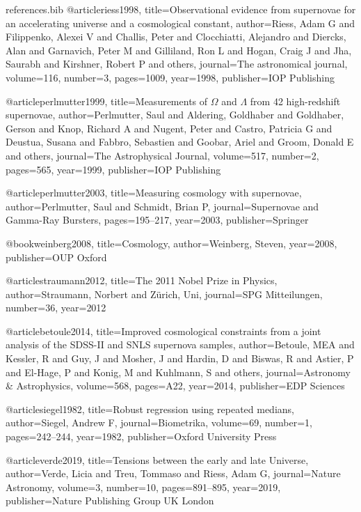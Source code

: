 \documentclass[aps,prl,reprint,amsmath,floatfix]{revtex4-2}
\begin{document}
\begin{filecontents}{references.bib}
@article{riess1998,
  title={Observational evidence from supernovae for an accelerating universe and a cosmological constant},
  author={Riess, Adam G and Filippenko, Alexei V and Challis, Peter and Clocchiatti, Alejandro and Diercks, Alan and Garnavich, Peter M and Gilliland, Ron L and Hogan, Craig J and Jha, Saurabh and Kirshner, Robert P and others},
  journal={The astronomical journal},
  volume={116},
  number={3},
  pages={1009},
  year={1998},
  publisher={IOP Publishing}
}

@article{perlmutter1999,
  title={Measurements of $\Omega$ and $\Lambda$ from 42 high-redshift supernovae},
  author={Perlmutter, Saul and Aldering, Goldhaber and Goldhaber, Gerson and Knop, Richard A and Nugent, Peter and Castro, Patricia G and Deustua, Susana and Fabbro, Sebastien and Goobar, Ariel and Groom, Donald E and others},
  journal={The Astrophysical Journal},
  volume={517},
  number={2},
  pages={565},
  year={1999},
  publisher={IOP Publishing}
}

@article{perlmutter2003,
  title={Measuring cosmology with supernovae},
  author={Perlmutter, Saul and Schmidt, Brian P},
  journal={Supernovae and Gamma-Ray Bursters},
  pages={195--217},
  year={2003},
  publisher={Springer}
}

@book{weinberg2008,
  title={Cosmology},
  author={Weinberg, Steven},
  year={2008},
  publisher={OUP Oxford}
}

@article{straumann2012,
  title={The 2011 Nobel Prize in Physics},
  author={Straumann, Norbert and Z{\"u}rich, Uni},
  journal={SPG Mitteilungen},
  number={36},
  year={2012}
}

@article{betoule2014,
  title={Improved cosmological constraints from a joint analysis of the SDSS-II and SNLS supernova samples},
  author={Betoule, MEA and Kessler, R and Guy, J and Mosher, J and Hardin, D and Biswas, R and Astier, P and El-Hage, P and Konig, M and Kuhlmann, S and others},
  journal={Astronomy \& Astrophysics},
  volume={568},
  pages={A22},
  year={2014},
  publisher={EDP Sciences}
}

@article{siegel1982,
  title={Robust regression using repeated medians},
  author={Siegel, Andrew F},
  journal={Biometrika},
  volume={69},
  number={1},
  pages={242--244},
  year={1982},
  publisher={Oxford University Press}
}

@article{verde2019,
  title={Tensions between the early and late Universe},
  author={Verde, Licia and Treu, Tommaso and Riess, Adam G},
  journal={Nature Astronomy},
  volume={3},
  number={10},
  pages={891--895},
  year={2019},
  publisher={Nature Publishing Group UK London}
}


\end{filecontents}
\end{document}
